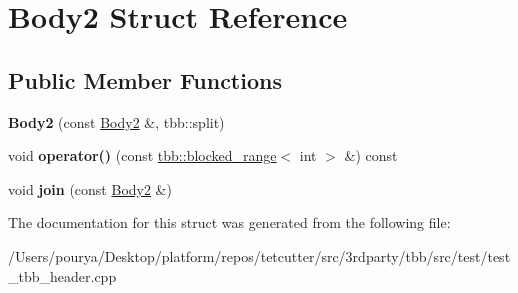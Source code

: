 \hypertarget{structBody2}{}\section{Body2 Struct Reference}
\label{structBody2}
\subsection*{Public Member Functions}
\begin{DoxyCompactItemize}
\item 
\hypertarget{structBody2_a42409018513f4d465b4071229a478515}{}{\bfseries Body2} (const \hyperlink{structBody2}{Body2} \&, tbb\+::split)\label{structBody2_a42409018513f4d465b4071229a478515}

\item 
\hypertarget{structBody2_a74dc8ad400f1ea55f88153ae5414e949}{}void {\bfseries operator()} (const \hyperlink{classtbb_1_1blocked__range}{tbb\+::blocked\+\_\+range}$<$ int $>$ \&) const \label{structBody2_a74dc8ad400f1ea55f88153ae5414e949}

\item 
\hypertarget{structBody2_a633fc85fa2a69591b2834078e089d095}{}void {\bfseries join} (const \hyperlink{structBody2}{Body2} \&)\label{structBody2_a633fc85fa2a69591b2834078e089d095}

\end{DoxyCompactItemize}


The documentation for this struct was generated from the following file\+:\begin{DoxyCompactItemize}
\item 
/\+Users/pourya/\+Desktop/platform/repos/tetcutter/src/3rdparty/tbb/src/test/test\+\_\+tbb\+\_\+header.\+cpp\end{DoxyCompactItemize}
